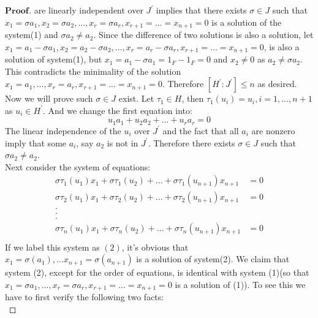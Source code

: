 \documentclass[a4paper, 11pt]{article}
\theoremstyle{remark}
\newenvironment{myprf}
{\renewcommand\qedsymbol{$ $}\begin{proof}[$\mathbf{Proof}$]}
  {\end{proof}}
\theoremstyle{definition}
\begin{document}
\begin{myprf}
            are linearly  independent over $J^{'}$ implies that there exists $\sigma\in J$
            such that $x_1=\sigma a_1,x_2=\sigma a_2,...,x_r=\sigma a_r,x_{r+1}=...=
            x_{n+1}=0$ is a solution of the system(1) and $\sigma a_2\neq a_2$. Since
            the difference of two solutions is also a solution, let $x_1=a_1-\sigma a_1,
            x_2=a_2-\sigma a_2,...,x_{r}=a_r-\sigma a_r,x_{r+1}=...=x_{n+1}=0$, is also
            a solution of system(1), but $x_1=a_1-\sigma a_1=1_F-1_F=0$ and $x_2\neq0$ as
            $a_2\neq \sigma a_2$. This contradicts the minimality of the solution 
            $x_1=a_1,...,x_r=a_r,x_{r+1}=...=x_{n+1}=0$. Therefore $[H^{'}:J^{'}]\leq n$
            as desired.\\
            \indent Now we will prove such $\sigma \in J$ exist. Let $\tau_1 \in H$, then
            $\tau_1(u_i)=u_i,i=1,...,n+1$ as $u_i\in H^{'}$. And we change the first 
            equation into:
            $$
            u_1a_1+u_2a_2+...+u_ra_r=0
            $$ The linear independence of the $u_i$ over $J^{'}$ and the fact that all
            $a_i$ are nonzero imply that some $a_i$, say $a_2$ is not in $J^{'}$. 
            Therefore there exists $\sigma \in J$ such that $\sigma a_2\neq a_2$. \\
            \indent Next consider the system of equations:
            $$
            \begin{aligned}
                    \sigma \tau_1(u_1)x_1+\sigma \tau_1(u_2)+...+\sigma \tau_1(u_{n+1})x_{n+1}&=0\\
                    \sigma \tau_2(u_1)x_1+\sigma \tau_2(u_2)+...+\sigma \tau_2(u_{n+1})x_{n+1}&=0\\
                    .\\
                    .\\
                    .\\
                    \sigma \tau_n(u_1)x_1+\sigma \tau_n(u_2)+...+\sigma \tau_n(u_{n+1})x_{n+1}&=0\\
            \end{aligned}
            $$ If we label this system as $(2)$, it's obvious that $x_1=\sigma(a_1),...
            x_{n+1}=\sigma(a_{n+1})$ is a solution of system(2). We claim that system 
            (2), except for the order of equations, is identical with system (1)(so that
            $x_1=\sigma a_1,...,x_r=\sigma a_r,x_{r+1}=...=x_{n+1}=0$ is a solution of 
            (1)). To see this we have to first verify the following two facts:\\

\end{myprf}
\end{document}
